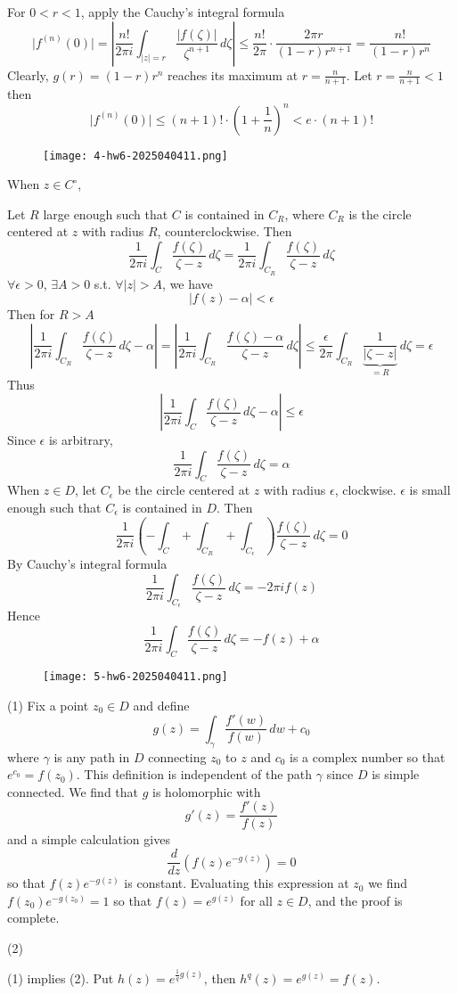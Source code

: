 For $0<r<1$, apply the Cauchy's integral formula
\[
\lvert f^{(n)}(0) \rvert =\left\lvert  \frac{n!}{2\pi i} \int_{\lvert z \rvert =r}^{} \frac{\lvert f(\zeta) \rvert }{\zeta^{n+1}}  \, d\zeta  \right\rvert \leq \frac{n!}{2\pi}\cdot\frac{2\pi r}{(1-r)r^{n+1}}  =\frac{n!}{(1-r)r^{n}}
\]
Clearly, $g(r)=(1-r)r^{n}$ reaches its maximum at $r=\frac{n}{n+1}$. Let $r=\frac{n}{n+1}<1$ then
\[
\lvert f^{(n)}(0) \rvert \leq (n+1)!\cdot\left( 1+\frac{1}{n}  \right)^{n}<e\cdot(n+1)!
\]
\begin{figure}[H]
\centering
\texttt{[image: 4-hw6-2025040411.png]}
\label{}
\end{figure}

When $z\in C^{\circ}$,

Let $R$ large enough such that $C$ is contained in $C_{R}$, where $C_{R}$ is the circle centered at $z$ with radius $R$, counterclockwise. Then
\[
\frac{1}{2\pi i}\int_{C}^{} \frac{f(\zeta)}{\zeta-z} \, d\zeta=\frac{1}{2\pi i}  \int_{C_{R}}^{} \frac{f(\zeta)}{\zeta-z} \, d\zeta
\]
$\forall \epsilon>0$, $\exists A>0$ s.t. $\forall \lvert z \rvert>A$, we have
\[
\lvert f(z)-\alpha \rvert<\epsilon
\]
Then for $R>A$
\[
\left\lvert  \frac{1}{2\pi i} \int_{C_{R}}^{} \frac{f(\zeta)}{\zeta-z} \, d\zeta-\alpha  \right\rvert =\left\lvert  \frac{1}{2\pi i} \int_{C_{R}}^{} \frac{f(\zeta)-\alpha}{\zeta-z} \, d\zeta  \right\rvert \leq \frac{\epsilon}{2\pi} \int_{C_{R}}^{} \frac{1}{\underbrace{ \lvert \zeta-z \rvert  }_{ =R }}  \, d\zeta= \epsilon
\]
Thus
\[
\left\lvert  \frac{1}{2\pi i}\int_{C}^{} \frac{f(\zeta)}{\zeta-z} \, d\zeta -\alpha  \right\rvert \leq \epsilon
\]
Since $\epsilon$ is arbitrary,
\[
\frac{1}{2\pi i}\int_{C}^{} \frac{f(\zeta)}{\zeta-z} \, d\zeta=\alpha  
\]
When $z\in D$, let $C_{\epsilon}$ be the circle centered at $z$ with radius $\epsilon$, clockwise. $\epsilon$ is small enough such that $C_{\epsilon}$ is contained in $D$. Then
\[
\frac{1}{2\pi i}\left( -\int_{C}^{} +\int_{C_{R}}+\int_{C_{\epsilon}} \right) \frac{f(\zeta)}{\zeta-z} \, d\zeta  =0
\]
By Cauchy's integral formula
\[
\frac{1}{2\pi i}\int_{C_{\epsilon}}^{} \frac{f(\zeta)}{\zeta-z} \, d\zeta=-2\pi if(z)
\]
Hence
\[
\frac{1}{2\pi i}\int_{C}^{} \frac{f(\zeta)}{\zeta-z} \, d\zeta=-f(z)+\alpha
\]
\begin{figure}[H]
\centering
\texttt{[image: 5-hw6-2025040411.png]}
\label{}
\end{figure}

(1)
Fix a point $z_0\in D$ and define
\[
g(z)=\int_{\gamma}^{} \frac{f'(w)}{f(w)}  \, dw+c_0
\]
where $\gamma$ is any path in $D$ connecting $z_0$ to $z$ and $c_0$ is a complex number so that $e^{ c_0 }=f(z_0)$. This definition is independent of the path $\gamma$ since $D$ is simple connected. We find that $g$ is holomorphic with
\[
g'(z)=\frac{f'(z)}{f(z)}
\]
and a simple calculation gives
\[
\frac{d}{dz}(f(z)e^{ -g(z) })=0
\]
so that $f(z)e^{ -g(z) }$ is constant. Evaluating this expression at $z_0$ we find $f(z_0)e^{ -g(z_0) }=1$ so that $f (z)=e^{ g (z) }$ for all $z\in D$, and the proof is complete.

(2)

(1) implies (2). Put $h(z)=e^{ \frac{1}{q}g(z) }$, then $h^{q}(z)=e^{ g(z) }=f(z)$.

